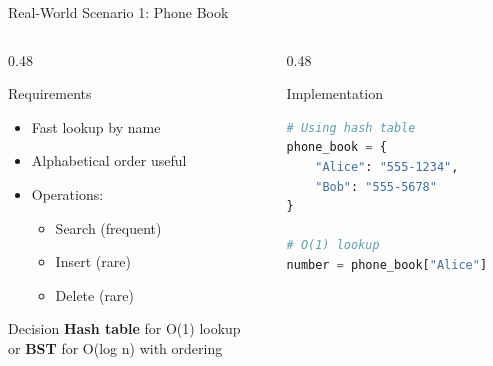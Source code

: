 \documentclass[aspectratio=169,xcolor=dvipsnames]{beamer}
\begin{document}
\begin{frame}[fragile]{Real-World Scenario 1: Phone Book}
  \begin{columns}
    \begin{column}{0.48\textwidth}
      \begin{block}{Requirements}
        \begin{itemize}
          \item Fast lookup by name
          \item Alphabetical order useful
          \item Operations:
            \begin{itemize}
              \item Search (frequent)
              \item Insert (rare)
              \item Delete (rare)
            \end{itemize}
        \end{itemize}
      \end{block}

      \vspace{0.3cm}

      \begin{alertblock}{Decision}
        \textbf{Hash table} for O(1) lookup \\
        or \textbf{BST} for O(log n) with ordering
      \end{alertblock}
    \end{column}
    \begin{column}{0.48\textwidth}
      \begin{exampleblock}{Implementation}
        \begin{lstlisting}[language=Python,basicstyle=\small\ttfamily]
# Using hash table
phone_book = {
    "Alice": "555-1234",
    "Bob": "555-5678"
}

# O(1) lookup
number = phone_book["Alice"]
        \end{lstlisting}
      \end{exampleblock}
    \end{column}
  \end{columns}
\end{frame}
\end{document}
